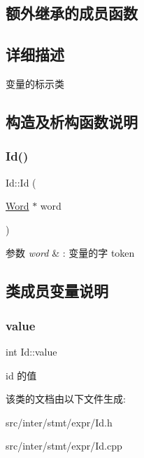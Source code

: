 \subsection*{额外继承的成员函数}


\subsection{详细描述}
变量的标示类 

\subsection{构造及析构函数说明}
\mbox{\label{class_id_a22122a40c4a61b6d2f7d20a3cc7c7275}} 
\subsubsection{\texorpdfstring{Id()}{Id()}}
{\footnotesize\ttfamily Id\+::\+Id (\begin{DoxyParamCaption}\item[{\hyperlink{class_word}{Word} $\ast$}]{word }\end{DoxyParamCaption})}


\begin{DoxyParams}{参数}
{\em word} & \+: 变量的字 token \\
\hline
\end{DoxyParams}


\subsection{类成员变量说明}
\mbox{\label{class_id_af7f7ed479b45ce150b88481b7b996e32}} 
\subsubsection{\texorpdfstring{value}{value}}
{\footnotesize\ttfamily int Id\+::value}

id 的值 

该类的文档由以下文件生成\+:\begin{DoxyCompactItemize}
\item 
src/inter/stmt/expr/Id.\+h\item 
src/inter/stmt/expr/Id.\+cpp\end{DoxyCompactItemize}
